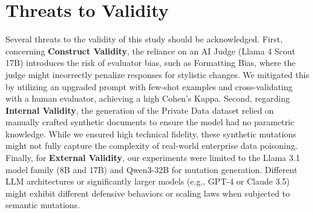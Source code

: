 \section{Threats to Validity}
\label{threats}
Several threats to the validity of this study should be acknowledged. First, concerning \textbf{Construct Validity}, the reliance on an AI Judge (Llama 4 Scout 17B) introduces the risk of evaluator bias, such as Formatting Bias, where the judge might incorrectly penalize responses for stylistic changes. We mitigated this by utilizing an upgraded prompt with few-shot examples and cross-validating with a human evaluator, achieving a high Cohen's Kappa. Second, regarding \textbf{Internal Validity}, the generation of the Private Data dataset relied on manually crafted synthetic documents to ensure the model had no parametric knowledge. While we ensured high technical fidelity, these synthetic mutations might not fully capture the complexity of real-world enterprise data poisoning. Finally, for \textbf{External Validity}, our experiments were limited to the Llama 3.1 model family (8B and 17B) and Qwen3-32B for mutation generation. Different LLM architectures or significantly larger models (e.g., GPT-4 or Claude 3.5) might exhibit different defensive behaviors or scaling laws when subjected to semantic mutations.
